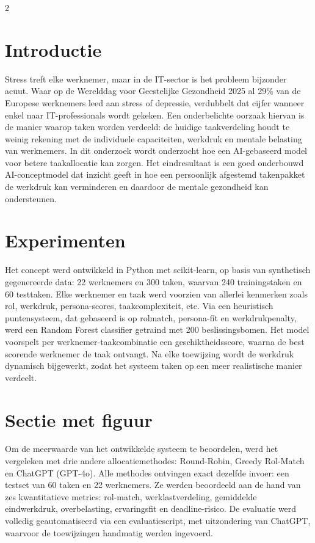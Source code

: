 \documentclass[a0,portrait]{hogent-poster}
\begin{document}
\begin{multicols}{2} %

\section{Introductie}

Stress treft elke werknemer, maar in de IT-sector is het probleem bijzonder acuut. Waar op de Werelddag voor Geestelijke Gezondheid 2025 al 29\% van de Europese werknemers leed aan stress of depressie, verdubbelt dat cijfer wanneer enkel naar IT-professionals wordt gekeken. Een onderbelichte oorzaak hiervan is de manier waarop taken worden verdeeld: de huidige taakverdeling houdt te weinig rekening met de individuele capaciteiten, werkdruk en mentale belasting van werknemers. In dit onderzoek wordt onderzocht hoe een AI-gebaseerd model voor betere taakallocatie kan zorgen. Het eindresultaat is een goed onderbouwd AI-conceptmodel dat inzicht geeft in hoe een persoonlijk afgestemd takenpakket de werkdruk kan verminderen en daardoor de mentale gezondheid kan ondersteunen.
\section{Experimenten}

Het concept werd ontwikkeld in Python met scikit-learn, op basis van synthetisch gegenereerde data: 22 werknemers en 300 taken, waarvan 240 trainingstaken en 60 testtaken. Elke werknemer en taak werd voorzien van allerlei kenmerken zoals rol, werkdruk, persona-scores, taakcomplexiteit, etc. Via een heuristisch puntensysteem, dat gebaseerd is op rolmatch, persona-fit en werkdrukpenalty, werd een Random Forest classifier getraind met 200 beslissingsbomen. Het model voorspelt per werknemer-taakcombinatie een geschiktheidsscore, waarna de best scorende werknemer de taak ontvangt. Na elke toewijzing wordt de werkdruk dynamisch bijgewerkt, zodat het systeem taken op een meer realistische manier verdeelt.

\section{Sectie met figuur}

Om de meerwaarde van het ontwikkelde systeem te beoordelen, werd het vergeleken met drie andere allocatiemethodes: Round-Robin, Greedy Rol-Match en ChatGPT (GPT-4o). Alle methodes ontvingen exact dezelfde invoer: een testset van 60 taken en 22 werknemers. Ze werden beoordeeld aan de hand van zes kwantitatieve metrics: rol-match, werklastverdeling, gemiddelde eindwerkdruk, overbelasting, ervaringsfit en deadline-risico. De evaluatie werd volledig geautomatiseerd via een evaluatiescript, met uitzondering van ChatGPT, waarvoor de toewijzingen handmatig werden ingevoerd.


\end{multicols}
\end{document}
